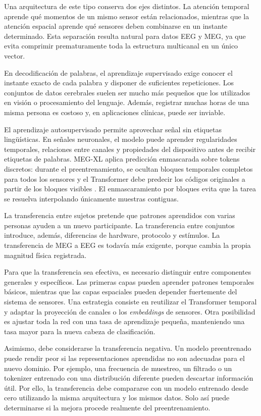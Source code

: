 Una arquitectura de este tipo conserva dos ejes distintos. La atención temporal aprende qué momentos de un mismo sensor están relacionados, mientras que la atención espacial aprende qué sensores deben combinarse en un instante determinado. Esta separación resulta natural para datos EEG y MEG, ya que evita comprimir prematuramente toda la estructura multicanal en un único vector.

En decodificación de palabras, el aprendizaje supervisado exige conocer el instante exacto de cada palabra y disponer de suficientes repeticiones. Los conjuntos de datos cerebrales suelen ser mucho más pequeños que los utilizados en visión o procesamiento del lenguaje. Además, registrar muchas horas de una misma persona es costoso y, en aplicaciones clínicas, puede ser inviable.

El aprendizaje autosupervisado permite aprovechar señal sin etiquetas lingüísticas. En señales neuronales, el modelo puede aprender regularidades temporales, relaciones entre canales y propiedades del dispositivo antes de recibir etiquetas de palabras. MEG-XL aplica predicción enmascarada sobre tokens discretos: durante el preentrenamiento, se ocultan bloques temporales completos para todos los sensores y el Transformer debe predecir los códigos originales a partir de los bloques visibles \cite{jayalath2026megxl}. El enmascaramiento por bloques evita que la tarea se resuelva interpolando únicamente muestras contiguas.

La transferencia entre sujetos pretende que patrones aprendidos con varias personas ayuden a un nuevo participante. La transferencia entre conjuntos introduce, además, diferencias de hardware, protocolo y estímulos. La transferencia de MEG a EEG es todavía más exigente, porque cambia la propia magnitud física registrada.

Para que la transferencia sea efectiva, es necesario distinguir entre componentes generales y específicos. Las primeras capas pueden aprender patrones temporales básicos, mientras que las capas espaciales pueden depender fuertemente del sistema de sensores. Una estrategia consiste en reutilizar el Transformer temporal y adaptar la proyección de canales o los \textit{embeddings} de sensores. Otra posibilidad es ajustar toda la red con una tasa de aprendizaje pequeña, manteniendo una tasa mayor para la nueva cabeza de clasificación.

Asimismo, debe considerarse la transferencia negativa. Un modelo preentrenado puede rendir peor si las representaciones aprendidas no son adecuadas para el nuevo dominio. Por ejemplo, una frecuencia de muestreo, un filtrado o un tokenizer entrenado con una distribución diferente pueden descartar información útil. Por ello, la transferencia debe compararse con un modelo entrenado desde cero utilizando la misma arquitectura y los mismos datos. Solo así puede determinarse si la mejora procede realmente del preentrenamiento.

